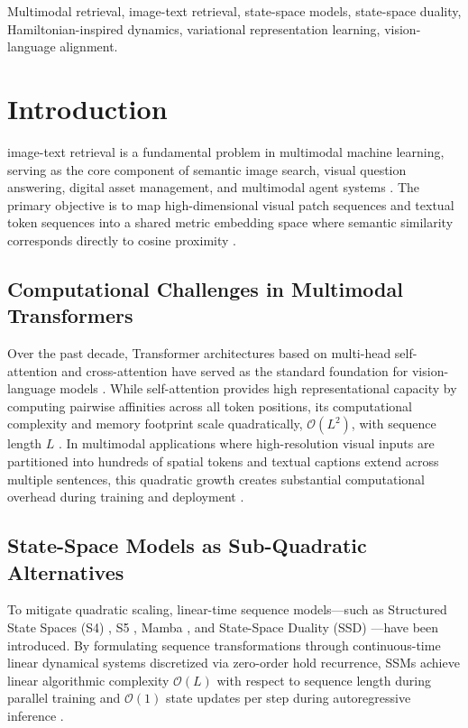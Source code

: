 \documentclass[journal]{IEEEtran}
\begin{document}
\begin{IEEEkeywords}
Multimodal retrieval, image-text retrieval, state-space models, state-space duality, Hamiltonian-inspired dynamics, variational representation learning, vision-language alignment.
\end{IEEEkeywords}

\section{Introduction}
\label{sec:introduction}
 image-text retrieval is a fundamental problem in multimodal machine learning, serving as the core component of semantic image search, visual question answering, digital asset management, and multimodal agent systems \cite{radford2021learning,li2022blip,jia2021scaling}. The primary objective is to map high-dimensional visual patch sequences and textual token sequences into a shared metric embedding space where semantic similarity corresponds directly to cosine proximity \cite{faghri2017vse++,lee2018stacked}.

\subsection{Computational Challenges in Multimodal Transformers}
Over the past decade, Transformer architectures based on multi-head self-attention and cross-attention have served as the standard foundation for vision-language models \cite{vaswani2017attention,dosovitskiy2020image,liu2019roberta}. While self-attention provides high representational capacity by computing pairwise affinities across all token positions, its computational complexity and memory footprint scale quadratically, $\mathcal{O}(L^2)$, with sequence length $L$ \cite{dao2022flashattention}. In multimodal applications where high-resolution visual inputs are partitioned into hundreds of spatial tokens and textual captions extend across multiple sentences, this quadratic growth creates substantial computational overhead during training and deployment \cite{li2023blip2,wang2023image}.

\subsection{State-Space Models as Sub-Quadratic Alternatives}
To mitigate quadratic scaling, linear-time sequence models---such as Structured State Spaces (S4) \cite{gu2021efficiently}, S5 \cite{smith2022simplified}, Mamba \cite{gu2023mamba}, and State-Space Duality (SSD) \cite{dao2024transformers}---have been introduced. By formulating sequence transformations through continuous-time linear dynamical systems discretized via zero-order hold recurrence, SSMs achieve linear algorithmic complexity $\mathcal{O}(L)$ with respect to sequence length during parallel training and $\mathcal{O}(1)$ state updates per step during autoregressive inference \cite{gu2020hippo,smith2022simplified}.
\end{document}
